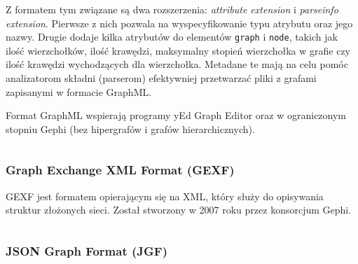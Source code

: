 Z formatem tym związane są dwa rozszerzenia: \textit{attribute extension} i \textit{parseinfo extension}. Pierwsze z nich pozwala na wyspecyfikowanie typu atrybutu oraz jego nazwy. Drugie dodaje kilka atrybutów do elementów \texttt{graph} i \texttt{node}, takich jak ilość wierzchołków, ilość krawędzi, maksymalny stopień wierzchołka w grafie czy ilość krawędzi wychodzących dla wierzchołka. Metadane te mają na celu pomóc analizatorom składni (parserom) efektywniej przetwarzać pliki z grafami zapisanymi w formacie GraphML. 

Format GraphML wspierają programy yEd Graph Editor oraz w ograniczonym stopniu Gephi (bez hipergrafów i grafów hierarchicznych).

\begin{figure}[h]
\centering
{}
\caption{} \label{fig:example-graph}
\end{figure}

\begin{listing}[H]
    \caption{Reprezentacja grafu z rysunku \ref{fig:example-graph} w formacie GraphML}
    \inputminted{xml}{example.graphml}
    \label{lst:graphml-example}
\end{listing}

\subsubsection{Graph Exchange XML Format (GEXF)}

GEXF jest formatem opierającym się na XML, który służy do opisywania struktur złożonych sieci. Został stworzony w 2007 roku przez konsorcjum Gephi.  

\begin{listing}[H]
        \caption{Reprezentacja grafu z rysunku \ref{fig:example-graph} w formacie GEXF}
    \inputminted{xml}{example.gexf}
    \label{lst:gexf-example}
\end{listing}

\subsubsection{JSON Graph Format (JGF)} 
\begin{listing}[H]
    \caption{Reprezentacja grafu z rysunku \ref{fig:example-graph} w formacie JGF}
    \inputminted{json}{example.json}
    \label{lst:jgf-example}
\end{listing}


